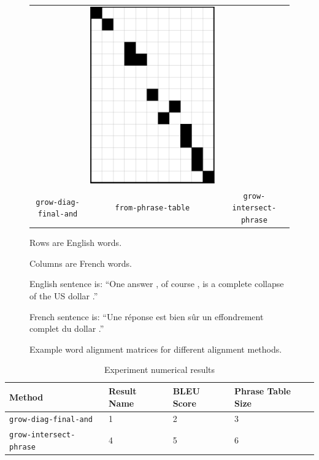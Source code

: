\documentclass[twocolumn]{article}
\newcommand{\originalAlign}{\texttt{grow-diag-final-and}}
\newcommand{\phraseAlign}{\texttt{from-phrase-table}}
\newcommand{\phraseIntersectAlign}{\texttt{grow-intersect-phrase}}
\begin{document}
\begin{figure}[tbp]
\begin{tabular}{c c c}
    & \includegraphics[scale=0.4]{imgs/phrase-intersect-align.png} \\
      \originalAlign{}
    & \phraseAlign{}
    & \phraseIntersectAlign{}
  \end{tabular}
  \begin{center}
    Rows are English words.

    Columns are French words.

    English sentence is:
    ``One answer , of course , is a complete collapse of the US dollar .''

    French sentence is:
    ``Une r\'{e}ponse est bien s\^{u}r un effondrement complet du dollar .''
  \end{center}
  \caption{Example word alignment matrices for different alignment methods.}
\end{figure}

\begin{table}[tbp]
  \begin{center}
    \begin{tabular}{| l | l | l | l |}
      \hline
      Method                  & Result Name & BLEU Score & Phrase Table Size \\
      \hline
      \originalAlign{}        & 1           & 2          & 3                 \\
      \hline
      \phraseIntersectAlign{} & 4           & 5          & 6                 \\
      \hline
    \end{tabular}
  \end{center}
  \caption{Experiment numerical results}
  \label{table:expResults}
\end{table}
\end{document}
